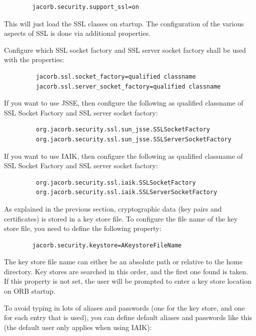 \begin{verbatim}
        jacorb.security.support_ssl=on
\end{verbatim}

This will just load the SSL classes on startup. The configuration of the
various aspects of SSL is done via additional properties.

Configure which SSL socket factory and SSL server socket factory shall
be used with the properties:
\begin{verbatim}
         jacorb.ssl.socket_factory=qualified classname
         jacorb.ssl.server_socket_factory=qualified classname 
\end{verbatim}

If you want to use JSSE, then configure the following as qualified
classname of SSL Socket Factory and SSL server socket factory: 
\begin{verbatim}
         org.jacorb.security.ssl.sun_jsse.SSLSocketFactory
         org.jacorb.security.ssl.sun_jsse.SSLServerSocketFactory
\end{verbatim}
     
If you want to use IAIK, then configure the following as qualified
classname of SSL Socket Factory and SSL server socket factory: 
\begin{verbatim}
         org.jacorb.security.ssl.iaik.SSLSocketFactory
         org.jacorb.security.ssl.iaik.SSLServerSocketFactory
\end{verbatim}

As explained  in the previous  section, cryptographic data  (key pairs
and  certificates) is  stored in  a  key store  file. To configure the
file name of the key store file, you need to define the following
property:

\begin{verbatim}
        jacorb.security.keystore=AKeystoreFileName
\end{verbatim}

The key store file name can either be an absolute path or relative to
the home directory. Key stores are searched in this order, and the
first one found is taken. If this property is not set, the user will be
prompted to enter a key store location on ORB startup.

To avoid  typing in  lots of  aliases and passwords  (one for  the key
store, and  one for each entry  that is used), you  can define default
aliases and passwords like this (the default user only applies when
using IAIK):

